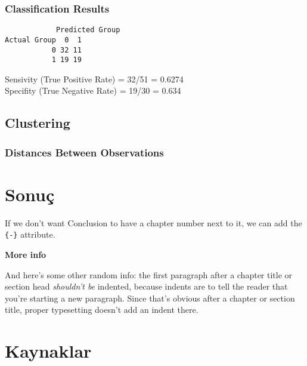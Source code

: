 \documentclass[12pt,twoside]{deuthesis}
\newenvironment{Shaded}{\begin{snugshade}}{\end{snugshade}}
\newcommand{\AttributeTok}[1]{\textcolor[rgb]{0.77,0.63,0.00}{#1}}
\newcommand{\FunctionTok}[1]{\textcolor[rgb]{0.00,0.00,0.00}{#1}}
\newcommand{\NormalTok}[1]{#1}
\newcommand{\SpecialCharTok}[1]{\textcolor[rgb]{0.00,0.00,0.00}{#1}}
\newcommand{\StringTok}[1]{\textcolor[rgb]{0.31,0.60,0.02}{#1}}
\begin{document}
\hypertarget{classification-results}{%
\subsection{Classification Results}\label{classification-results}}
\begin{Shaded}
\end{Shaded}
\begin{verbatim}
            Predicted Group
Actual Group  0  1
           0 32 11
           1 19 19
\end{verbatim}
Sensivity (True Positive Rate) = 32/51 = 0.6274\\
\setlength{\parindent}{0in}
Specifity (True Negative Rate) = 19/30 = 0.634

\hypertarget{clustering}{%
\section{Clustering}\label{clustering}}

\hypertarget{distances-between-observations}{%
\subsection{Distances Between Observations}\label{distances-between-observations}}

\hypertarget{sonuuxe7}{%
\chapter*{Sonuç}\label{sonuuxe7}}

If we don't want Conclusion to have a chapter number next to it, we can add the \texttt{\{-\}} attribute.

\textbf{More info}

And here's some other random info: the first paragraph after a chapter title or section head \emph{shouldn't be} indented, because indents are to tell the reader that you're starting a new paragraph. Since that's obvious after a chapter or section title, proper typesetting doesn't add an indent there.

\hypertarget{kaynaklar}{%
\chapter*{Kaynaklar}\label{kaynaklar}}


\hypertarget{refs}{}
\begin{CSLReferences}{0}{0}
\end{CSLReferences}
\setlength{\parindent}{-0.20in}
\setlength{\leftskip}{0.20in}
\setlength{\parskip}{8pt}
\end{document}
